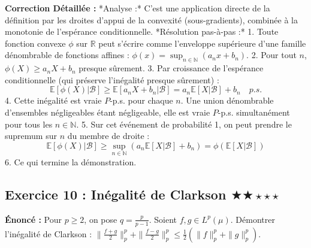 \documentclass[11pt,a4paper]{article}
\begin{document}
\textbf{Correction Détaillée :}
*Analyse :* C'est une application directe de la définition par les droites d'appui de la convexité (sous-gradients), combinée à la monotonie de l'espérance conditionnelle.
*Résolution pas-à-pas :*
1. Toute fonction convexe $\phi$ sur $\mathbb{R}$ peut s'écrire comme l'enveloppe supérieure d'une famille dénombrable de fonctions affines : $\phi(x) = \sup_{n \in \mathbb{N}} (a_n x + b_n)$.
2. Pour tout $n$, $\phi(X) \ge a_n X + b_n$ presque sûrement.
3. Par croissance de l'espérance conditionnelle (qui préserve l'inégalité presque sûrement) :
   $$\mathbb{E}[\phi(X) | \mathcal{B}] \ge \mathbb{E}[a_n X + b_n | \mathcal{B}] = a_n \mathbb{E}[X | \mathcal{B}] + b_n \quad p.s.$$
4. Cette inégalité est vraie $P$-p.s. pour chaque $n$. Une union dénombrable d'ensembles négligeables étant négligeable, elle est vraie $P$-p.s. simultanément pour tous les $n \in \mathbb{N}$.
5. Sur cet événement de probabilité 1, on peut prendre le supremum sur $n$ du membre de droite :
   $$\mathbb{E}[\phi(X) | \mathcal{B}] \ge \sup_{n \in \mathbb{N}} (a_n \mathbb{E}[X | \mathcal{B}] + b_n) = \phi(\mathbb{E}[X | \mathcal{B}])$$
6. Ce qui termine la démonstration.


\subsection*{Exercice 10 : Inégalité de Clarkson $\bigstar\bigstar\star\star\star$}

\textbf{Énoncé :} Pour $p \ge 2$, on pose $q = \frac{p}{p-1}$. Soient $f, g \in L^p(\mu)$. Démontrer l'inégalité de Clarkson :
$\|\frac{f+g}{2}\|_p^p + \|\frac{f-g}{2}\|_p^p \le \frac{1}{2}(\|f\|_p^p + \|g\|_p^p)$.
\end{document}
